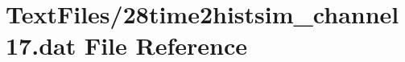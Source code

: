 \hypertarget{28time2histsim__channel17_8dat}{}\section{Text\+Files/28time2histsim\+\_\+channel17.dat File Reference}
\label{28time2histsim__channel17_8dat}
